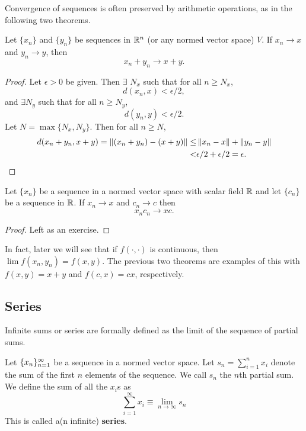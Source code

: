Convergence of sequences is often preserved by arithmetic
operations, as in the following two theorems.
\begin{theorem}
  Let $\{x_n\}$ and $\{y_n\}$ be sequences in $\mathbb{R}^n$ (or any normed
  vector space)
  $V$. If $x_n \to x$ and $y_n \to y$, then
  \[ x_n + y_n \to x + y. \]
\end{theorem}
\begin{proof}
  Let $\epsilon > 0$ be given. Then $\exists$ $N_x$ such that for all
  $n \geq N_x$, 
  \[ d(x_n,x) < \epsilon/2,\] and $\exists N_y$ such that
  for all $n \geq N_y$,  
  \[ d(y_n,y) < \epsilon/2. \]
  Let $N =\max\{N_x,N_y\}$. Then for all $n \geq N$, 
  \begin{align*}
    d(x_n + y_n,x+y) = \left\Vert {(x_n + y_n) - (x+y)} \right\Vert \leq & \left\Vert {x_n -
      x} \right\Vert + \left\Vert {y_n - y} \right\Vert \\
    < & \epsilon/2 + \epsilon /2  = \epsilon.
  \end{align*}  
\end{proof}
\begin{theorem}
  Let $\{x_n \}$ be a sequence in a normed vector space with scalar
  field $\mathbb{R}$ and let $\{c_n\}$ be a sequence in $\mathbb{R}$. If
  $x_n \to x$ and $c_n \to c$ then 
  \[ x_n c_n \to x c. \]
\end{theorem}
\begin{proof}
  Left as an exercise.
\end{proof}
In fact, later we will see that if $f(\cdot,\cdot)$ is
continuous, then $\lim f(x_n, y_n) = f(x,y)$. The previous two
theorems are examples of this with $f(x,y) = x+y$ and $f(c,x) = c x$,
respectively.

\subsection{Series}

Infinite sums or series are formally defined as the limit of the
sequence of partial sums. 
\begin{definition}
  Let $\{{x}_n \}_{n=1}^\infty$ be a sequence in a normed vector space. Let $s_n =
  \sum_{i=1}^n x_i$ denote the sum of the first $n$ elements of the
  sequence. We call $s_n$ the $n$th partial sum. We define the sum of
  all the $x_i$s as
  \[ \sum_{i=1}^\infty x_i \equiv \lim_{n \to \infty} s_n \]
  This is called a(n infinite) \textbf{series}. 
\end{definition}

